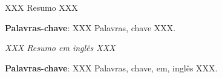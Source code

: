 \documentclass[12pt,
openright, 
oneside, %
a4paper,    %
brazil]{facom-ufu-abntex2}
\begin{document}
\frenchspacing 

\imprimircapa
\imprimirfolhaderosto







	
\begin{resumo} %
XXX Resumo XXX
 
 \vspace{\onelineskip}
 \noindent
 \textbf{Palavras-chave}: XXX Palavras, chave XXX. %
\end{resumo}

\renewcommand{\resumoname}{Abstract}
\begin{resumo}\itshape %
    XXX Resumo em inglês XXX

 \vspace{\onelineskip}
 \noindent
 {\normalfont \textbf{ Palavras-chave}}: XXX Palavras, chave, em, inglês XXX. %
 
\end{resumo}

\listailustracoes

\listatabelas




\sumario


\textual
\end{document}
